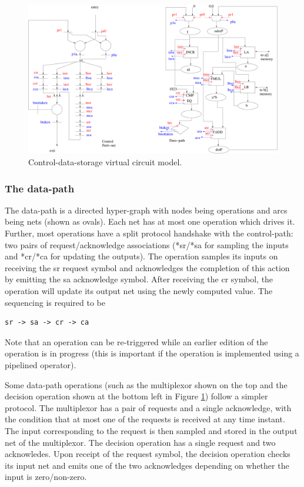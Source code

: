 \documentclass[conference]{IEEEtran}
\begin{document}
\begin{figure}[ht]
  \centering
  \includegraphics[width=\linewidth]{dotP.pdf}
  \caption{Control-data-storage virtual circuit model.}
  \label{fig:dotP}
\end{figure}



\subsubsection{The data-path}

The data-path is a directed hyper-graph with nodes being
operations and arcs being nets (shown as ovals).  Each
net has at most one operation which drives it.  Further, most
operations have  a split protocol handshake with
the control-path:  two pairs of request/acknowledge 
associations (*sr/*sa for sampling the inputs  and *cr/*ca for
updating the outputs).    The operation samples its inputs
on receiving the sr request symbol and acknowledges the completion
of this action by emitting the sa acknowledge symbol.  After receiving
the cr symbol, the operation will update its output net
using the newly computed value. The sequencing is required to be
\begin{verbatim}
sr -> sa -> cr -> ca
\end{verbatim}
Note that an operation can be re-triggered while an earlier
edition of the operation
is in progress (this is important if the operation is implemented
using a pipelined operator).

Some data-path operations (such as the multiplexor
shown on the top and the decision operation shown at the bottom
left in Figure \ref{fig:dotP}) follow a simpler protocol.  The multiplexor
has a pair of requests and a single acknowledge, with the condition
that at most one of the requests is received at any time instant.
The input corresponding to the request is then sampled and stored
in the output net of the multiplexor.
The decision operation has a single request and two acknowledes.  Upon
receipt of the request symbol, the decision operation checks its input net
and emits one of the two acknowledges depending on whether the input
is zero/non-zero.
\end{document}
